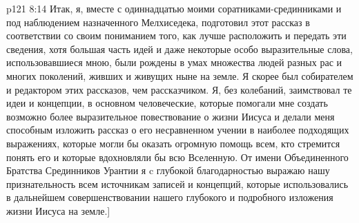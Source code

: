 \vs p121 8:14 Итак, я, вместе с одиннадцатью моими соратниками\hyp{}срединниками и под наблюдением назначенного Мелхиседека, подготовил этот рассказ в соответствии со своим пониманием того, как лучше расположить и передать эти сведения, хотя большая часть идей и даже некоторые особо выразительные слова, использовавшиеся мною, были рождены в умах множества людей разных рас и многих поколений, живших и живущих ныне на земле. Я скорее был собирателем и редактором этих рассказов, чем рассказчиком. Я, без колебаний, заимствовал те идеи и концепции, в основном человеческие, которые помогали мне создать возможно более выразительное повествование о жизни Иисуса и делали меня способным изложить рассказ о его несравненном учении в наиболее подходящих выражениях, которые могли бы оказать огромную помощь всем, кто стремится понять его и которые вдохновляли бы всю Вселенную. От имени Объединенного Братства Срединников Урантии я c глубокой благодарностью выражаю нашу признательность всем источникам записей и концепций, которые использовались в дальнейшем совершенствовании нашего глубокого и подробного изложения жизни Иисуса на земле.]
